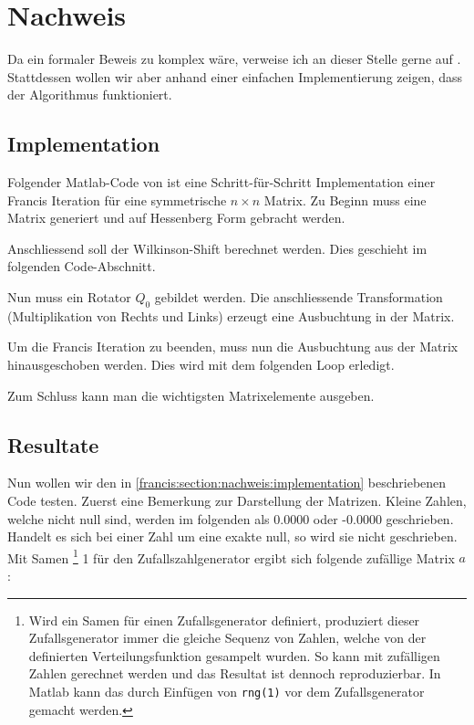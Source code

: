 \section{Nachweis\label{francis:section:nachweis}}

Da ein formaler Beweis zu komplex wäre, verweise ich an dieser Stelle gerne auf \cite{francis:watkins_book}.
Stattdessen wollen wir aber anhand einer einfachen Implementierung zeigen, dass der Algorithmus funktioniert.

\subsection{Implementation\label{francis:section:nachweis:implementation}}
Folgender Matlab-Code von \cite{francis:watkins_book} ist eine Schritt-für-Schritt Implementation einer Francis Iteration für eine symmetrische $n \times n$ Matrix.
Zu Beginn muss eine Matrix generiert und auf Hessenberg Form gebracht werden.

Anschliessend soll der Wilkinson-Shift berechnet werden.
Dies geschieht im folgenden Code-Abschnitt.

Nun muss ein Rotator $Q_0$ gebildet werden.
Die anschliessende Transformation (Multiplikation von Rechts und Links) erzeugt eine Ausbuchtung in der Matrix.

Um die Francis Iteration zu beenden, muss nun die Ausbuchtung aus der Matrix hinausgeschoben werden.
Dies wird mit dem folgenden Loop erledigt.

Zum Schluss kann man die wichtigsten Matrixelemente ausgeben.


\subsection{Resultate\label{francis:section:nachweis:resultate}}
Nun wollen wir den in \ref{francis:section:nachweis:implementation} beschriebenen Code testen.
Zuerst eine Bemerkung zur Darstellung der Matrizen. 
Kleine Zahlen, welche nicht null sind, werden im folgenden als 0.0000 oder -0.0000 geschrieben.
Handelt es sich bei einer Zahl um eine exakte null, so wird sie nicht geschrieben.
Mit Samen \footnote{Wird ein Samen für einen Zufallsgenerator definiert, produziert dieser Zufallsgenerator immer die gleiche Sequenz von Zahlen, welche von der definierten Verteilungsfunktion gesampelt wurden.
So kann mit zufälligen Zahlen gerechnet werden und das Resultat ist dennoch reproduzierbar.
In Matlab kann das durch Einfügen von \texttt{rng(1)} vor dem Zufallsgenerator gemacht werden.}
1 für den Zufallszahlgenerator ergibt sich folgende zufällige Matrix $a$:

